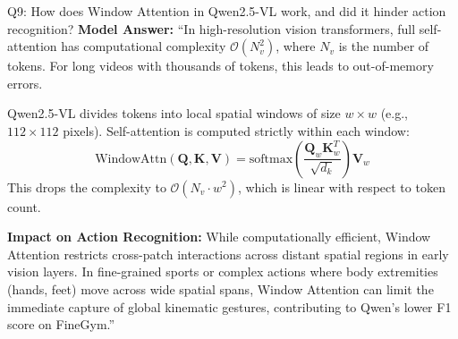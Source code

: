 \documentclass[a4paper, 11pt]{article}
\begin{document}
\begin{defensebox}{Q9: How does Window Attention in Qwen2.5-VL work, and did it hinder action recognition?}
\textbf{Model Answer:}
``In high-resolution vision transformers, full self-attention has computational complexity $\mathcal{O}(N_v^2)$, where $N_v$ is the number of tokens. For long videos with thousands of tokens, this leads to out-of-memory errors.

Qwen2.5-VL divides tokens into local spatial windows of size $w \times w$ (e.g., $112 \times 112$ pixels). Self-attention is computed strictly within each window:
\begin{equation}
    \text{WindowAttn}(\mathbf{Q}, \mathbf{K}, \mathbf{V}) = \text{softmax}\left(\frac{\mathbf{Q}_w \mathbf{K}_w^T}{\sqrt{d_k}}\right)\mathbf{V}_w
\end{equation}
This drops the complexity to $\mathcal{O}(N_v \cdot w^2)$, which is linear with respect to token count.

\textbf{Impact on Action Recognition:} While computationally efficient, Window Attention restricts cross-patch interactions across distant spatial regions in early vision layers. In fine-grained sports or complex actions where body extremities (hands, feet) move across wide spatial spans, Window Attention can limit the immediate capture of global kinematic gestures, contributing to Qwen's lower F1 score on FineGym.''
\end{defensebox}

\vspace{0.2cm}
\end{document}
